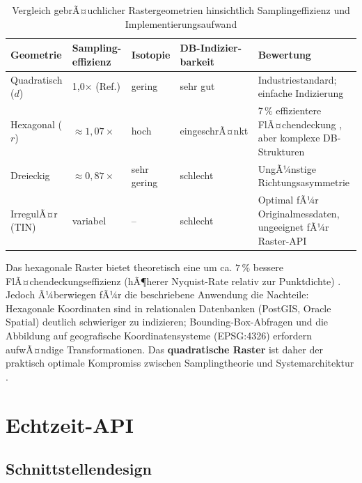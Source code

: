 ﻿\documentclass[a4paper,12pt]{article}
\theoremstyle{definition}
\begin{document}
\begin{table}[h]
\centering
\caption{Vergleich gebrÃ¤uchlicher Rastergeometrien hinsichtlich
         Samplingeffizienz und Implementierungsaufwand}
\label{tab:geometrien}
\renewcommand{\arraystretch}{1.4}
\begin{tabular}{@{}p{3.0cm}p{2.5cm}p{2.5cm}p{2.5cm}p{3.5cm}@{}}
\toprule
\textbf{Geometrie} & \textbf{Sampling-\newline effizienz} & \textbf{Isotopie}
  & \textbf{DB-Indizier-\newline barkeit} & \textbf{Bewertung} \\
\midrule
Quadratisch ($d$) & 1{,}0$\times$ (Ref.) & gering & sehr gut
  & Industriestandard; einfache Indizierung \\
Hexagonal ($r$) & $\approx 1{,}07\times$ & hoch & eingeschrÃ¤nkt
  & 7\,\% effizientere FlÃ¤chendeckung \cite{conway2013},
    aber komplexe DB-Strukturen \\
Dreieckig & $\approx 0{,}87\times$ & sehr gering & schlecht
  & UngÃ¼nstige Richtungsasymmetrie \\
IrregulÃ¤r (TIN) & variabel & -- & schlecht
  & Optimal fÃ¼r Originalmessdaten, ungeeignet fÃ¼r Raster-API \\
\bottomrule
\end{tabular}
\end{table}

\noindent
Das hexagonale Raster bietet theoretisch eine um ca. $7\,\%$
bessere FlÃ¤chendeckungseffizienz (hÃ¶herer Nyquist-Rate relativ
zur Punktdichte) \cite{conway2013}. Jedoch Ã¼berwiegen fÃ¼r die
beschriebene Anwendung die Nachteile: Hexagonale Koordinaten sind
in relationalen Datenban\-ken (PostGIS, Oracle Spatial) deutlich
schwieriger zu indizieren; Bounding-Box-Abfragen und die Abbildung
auf geografische Koordinatensysteme (EPSG:4326) erfordern aufwÃ¤ndige
Transformationen. Das \textbf{quadratische Raster} ist daher der
praktisch optimale Kompromiss zwischen Samplingtheorie und
Systemarchitektur \cite{li2008}.

\section{Echtzeit-API}

\subsection{Schnittstellendesign}
\end{document}
